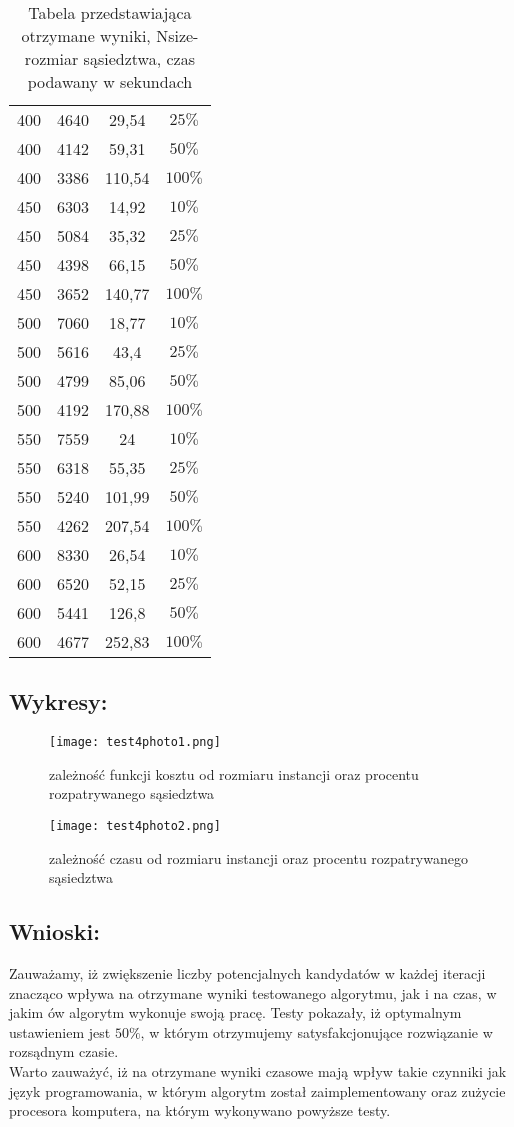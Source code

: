 \begin{table}[H]
\begin{tabular}{||c c c c||}
        400	& 4640	& 29,54	& $25\%$ \\
        400	& 4142	& 59,31	& $50\%$ \\
        400	& 3386	& 110,54	& $100\%$ \\
        450	& 6303	& 14,92	& $10\%$ \\
        450	& 5084	& 35,32	& $25\%$ \\
        450	& 4398	& 66,15	& $50\%$ \\
        450	& 3652	& 140,77	& $100\%$ \\
        500	& 7060	& 18,77	& $10\%$ \\
        500	& 5616	& 43,4	& $25\%$ \\
        500	& 4799	& 85,06	& $50\%$ \\
        500	& 4192	& 170,88	& $100\%$ \\
        550	& 7559	& 24	& $10\%$ \\
        550	& 6318	& 55,35	& $25\%$ \\
        550	& 5240	& 101,99	& $50\%$ \\
        550	& 4262	& 207,54	& $100\%$ \\
        600	& 8330	& 26,54	& $10\%$ \\
        600	& 6520	& 52,15	& $25\%$ \\
        600	& 5441	& 126,8	& $50\%$ \\
        600	& 4677	& 252,83	& $100\%$ \\
       \hline
      \end{tabular}
      \caption{Tabela przedstawiająca otrzymane wyniki, Nsize- rozmiar sąsiedztwa, czas podawany w sekundach}
      \end{table}
  \subsection{Wykresy: }
    \begin{figure}[H]
      \texttt{[image: test4photo1.png]}
      \centering
      \caption{zależność funkcji kosztu od rozmiaru instancji oraz procentu rozpatrywanego sąsiedztwa}
    \end{figure}
    \begin{figure}[H]
      \texttt{[image: test4photo2.png]}
      \centering
      \caption{zależność czasu od rozmiaru instancji oraz procentu rozpatrywanego sąsiedztwa}
    \end{figure}
  \subsection{Wnioski: }
  Zauważamy, iż zwiększenie liczby potencjalnych kandydatów w każdej iteracji znacząco wpływa na otrzymane wyniki testowanego algorytmu, jak i na czas,
  w jakim ów algorytm wykonuje swoją pracę. Testy pokazały, iż optymalnym ustawieniem jest $50\%$, w którym otrzymujemy satysfakcjonujące rozwiązanie w rozsądnym czasie.\\
  Warto zauważyć, iż na otrzymane wyniki czasowe mają wpływ takie czynniki jak język programowania, w którym algorytm został zaimplementowany oraz zużycie procesora
  komputera, na którym wykonywano powyższe testy.

